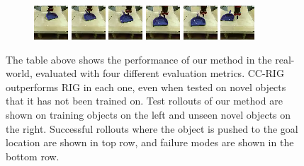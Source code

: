 \begin{figure}
\begin{subfigure}[b]{0.49\textwidth}
        \includegraphics[width=0.14\linewidth]{ccrig/img/real_env_rollout_novel/0/0.png}
        \includegraphics[width=0.14\linewidth]{ccrig/img/real_env_rollout_novel/0/1.png}
        \includegraphics[width=0.14\linewidth]{ccrig/img/real_env_rollout_novel/0/2.png}
        \includegraphics[width=0.14\linewidth]{ccrig/img/real_env_rollout_novel/0/3.png}
        \includegraphics[width=0.14\linewidth]{ccrig/img/real_env_rollout_novel/0/4.png}
        \hspace{0.01\linewidth}
        \includegraphics[width=0.14\linewidth]{ccrig/img/real_env_rollout_novel/0/goal.png}
    \end{subfigure}

    \caption{The table above shows the performance of our method in the real-world, evaluated with four different evaluation metrics\protect\footnotemark. CC-RIG outperforms RIG in each one, even when tested on novel objects that it has not been trained on.
    Test rollouts of our method are shown on training objects on the left and unseen novel objects on the right.
    Successful rollouts where the object is pushed to the goal location are shown in top row, and failure modes are shown in the bottom row. }
    \label{fig:realworld-robot-pushing-results}
\end{figure}

